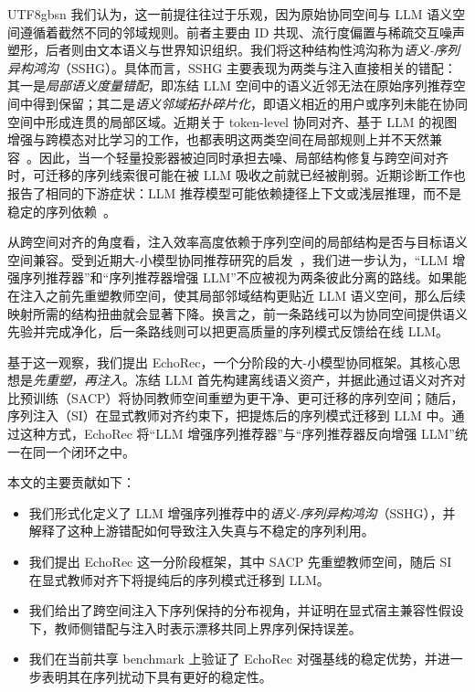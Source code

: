 \documentclass{article}
\begin{document}
\begin{CJK*}{UTF8}{gbsn}
我们认为，这一前提往往过于乐观，因为原始协同空间与 LLM 语义空间遵循着截然不同的邻域规则。前者主要由 ID 共现、流行度偏置与稀疏交互噪声塑形，后者则由文本语义与世界知识组织。我们将这种结构性鸿沟称为\emph{语义-序列异构鸿沟}（SSHG）。具体而言，SSHG 主要表现为两类与注入直接相关的错配：其一是\emph{局部语义度量错配}，即冻结 LLM 空间中的语义近邻无法在原始序列推荐空间中得到保留；其二是\emph{语义邻域拓扑碎片化}，即语义相近的用户或序列未能在协同空间中形成连贯的局部区域。近期关于 token-level 协同对齐、基于 LLM 的视图增强与跨模态对比学习的工作，也都表明这两类空间在局部规则上并不天然兼容~\cite{lin2026tca4rec,lu2025cllmrec,xu2024cmclrec}。因此，当一个轻量投影器被迫同时承担去噪、局部结构修复与跨空间对齐时，可迁移的序列线索很可能在被 LLM 吸收之前就已经被削弱。近期诊断工作也报告了相同的下游症状：LLM 推荐模型可能依赖捷径上下文或浅层推理，而不是稳定的序列依赖~\cite{kim2025lost,wang2026contextbias,yu2026thinkrec}。

从跨空间对齐的角度看，注入效率高度依赖于序列空间的局部结构是否与目标语义空间兼容。受到近期大-小模型协同推荐研究的启发~\cite{zhang2026crossscale,lv2025lsc4rec}，我们进一步认为，“LLM 增强序列推荐器”和“序列推荐器增强 LLM”不应被视为两条彼此分离的路线。如果能在注入之前先重塑教师空间，使其局部邻域结构更贴近 LLM 语义空间，那么后续映射所需的结构扭曲就会显著下降。换言之，前一条路线可以为协同空间提供语义先验并完成净化，后一条路线则可以把更高质量的序列模式反馈给在线 LLM。

基于这一观察，我们提出 EchoRec，一个分阶段的大-小模型协同框架。其核心思想是\emph{先重塑，再注入}。冻结 LLM 首先构建离线语义资产，并据此通过语义对齐对比预训练（SACP）将协同教师空间重塑为更干净、更可迁移的序列空间；随后，序列注入（SI）在显式教师对齐约束下，把提炼后的序列模式迁移到 LLM 中。通过这种方式，EchoRec 将“LLM 增强序列推荐器”与“序列推荐器反向增强 LLM”统一在同一个闭环之中。

本文的主要贡献如下：
\begin{itemize}[leftmargin=1.5em]
\item 我们形式化定义了 LLM 增强序列推荐中的\emph{语义-序列异构鸿沟}（SSHG），并解释了这种上游错配如何导致注入失真与不稳定的序列利用。
\item 我们提出 EchoRec 这一分阶段框架，其中 SACP 先重塑教师空间，随后 SI 在显式教师对齐下将提纯后的序列模式迁移到 LLM。
\item 我们给出了跨空间注入下序列保持的分布视角，并证明在显式宿主兼容性假设下，教师侧错配与注入时表示漂移共同上界序列保持误差。
\item 我们在当前共享 benchmark 上验证了 EchoRec 对强基线的稳定优势，并进一步表明其在序列扰动下具有更好的稳定性。
\end{itemize}


\end{CJK*}
\end{document}
